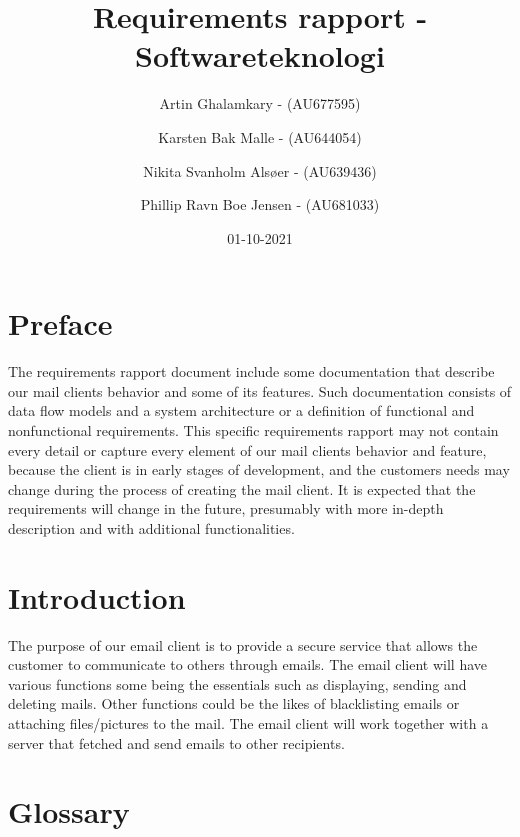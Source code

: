\documentclass{article}
\title{Requirements rapport - Softwareteknologi} %
\author{Artin Ghalamkary - (AU677595) \and Karsten Bak Malle - (AU644054) \and Nikita Svanholm Alsøer - (AU639436) \and Phillip Ravn Boe Jensen - (AU681033)}%
\date{01-10-2021}
\begin{document}
\maketitle
\section*{Preface} 
The requirements rapport document include some documentation that describe our mail clients behavior and some of its features. Such documentation consists of data flow models and a system architecture or a definition of functional and nonfunctional requirements. This specific requirements rapport may not contain every detail or capture every element of our mail clients behavior and feature, because the client is in early stages of development, and the customers needs may change during the process of creating the mail client. It is expected that the requirements will change in the future, presumably with more in-depth description and with additional functionalities. \\


\section*{Introduction} 
The purpose of our email client is to provide a secure service that allows the customer to communicate to others through emails. The email client will have various functions some being the essentials such as displaying, sending and deleting mails. Other functions could be the likes of blacklisting emails or attaching files/pictures to the mail. The email client will work together with a server that fetched and send emails to other recipients. 

\newpage
\section*{Glossary} 
\end{document}
